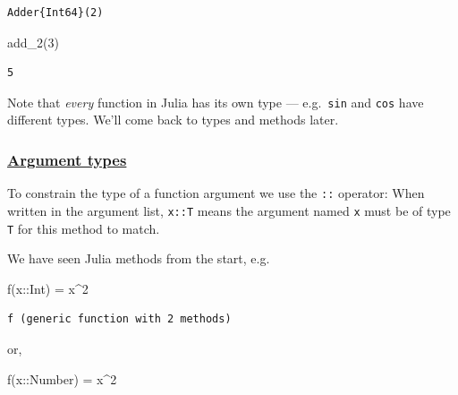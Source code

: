 \documentclass[
]{article}
\newenvironment{Shaded}{\begin{snugshade}}{\end{snugshade}}
\newcommand{\DataTypeTok}[1]{\textcolor[rgb]{0.68,0.00,0.00}{#1}}
\newcommand{\FloatTok}[1]{\textcolor[rgb]{0.68,0.00,0.00}{#1}}
\newcommand{\FunctionTok}[1]{\textcolor[rgb]{0.28,0.35,0.67}{#1}}
\newcommand{\NormalTok}[1]{\textcolor[rgb]{0.00,0.23,0.31}{#1}}
\newcommand{\OperatorTok}[1]{\textcolor[rgb]{0.37,0.37,0.37}{#1}}
\begin{document}
\begin{verbatim}
Adder{Int64}(2)
\end{verbatim}

\begin{Shaded}
\begin{Highlighting}[]
\FunctionTok{add\_2}\NormalTok{(}\FloatTok{3}\NormalTok{)}
\end{Highlighting}
\end{Shaded}

\begin{verbatim}
5
\end{verbatim}

Note that \emph{every} function in Julia has its own type ---
e.g.~\texttt{sin} and \texttt{cos} have different types. We'll come back
to types and methods later.

\subsubsection{\texorpdfstring{\href{https://docs.julialang.org/en/v1/manual/functions/\#Argument-type-declarations}{Argument
types}}{Argument types}}\label{argument-types}

To constrain the type of a function argument we use the \texttt{::}
operator: When written in the argument list, \texttt{x::T} means the
argument named \texttt{x} must be of type \texttt{T} for this method to
match.

We have seen Julia methods from the start, e.g.

\begin{Shaded}
\begin{Highlighting}[]
\FunctionTok{f}\NormalTok{(x}\OperatorTok{::}\DataTypeTok{Int}\NormalTok{) }\OperatorTok{=}\NormalTok{ x}\OperatorTok{\^{}}\FloatTok{2}
\end{Highlighting}
\end{Shaded}

\begin{verbatim}
f (generic function with 2 methods)
\end{verbatim}

or,

\begin{Shaded}
\begin{Highlighting}[]
\FunctionTok{f}\NormalTok{(x}\OperatorTok{::}\DataTypeTok{Number}\NormalTok{) }\OperatorTok{=}\NormalTok{ x}\OperatorTok{\^{}}\FloatTok{2}
\end{Highlighting}
\end{Shaded}
\end{document}
